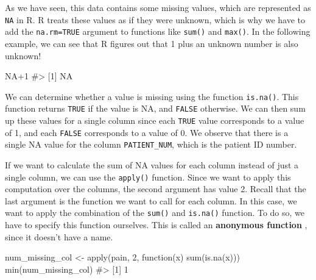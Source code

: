 \documentclass[
  letterpaper,
]{latex/krantz}
\makeatletter
\newenvironment{Shaded}{\begin{snugshade}}{\end{snugshade}}
\newcommand{\CommentTok}[1]{\textcolor[rgb]{0.37,0.37,0.37}{#1}}
\newcommand{\ConstantTok}[1]{\textcolor[rgb]{0.56,0.35,0.01}{#1}}
\newcommand{\ControlFlowTok}[1]{\textcolor[rgb]{0.00,0.23,0.31}{#1}}
\newcommand{\DecValTok}[1]{\textcolor[rgb]{0.68,0.00,0.00}{#1}}
\newcommand{\FunctionTok}[1]{\textcolor[rgb]{0.28,0.35,0.67}{#1}}
\newcommand{\NormalTok}[1]{\textcolor[rgb]{0.00,0.23,0.31}{#1}}
\newcommand{\OtherTok}[1]{\textcolor[rgb]{0.00,0.23,0.31}{#1}}
\newcommand{\SpecialCharTok}[1]{\textcolor[rgb]{0.37,0.37,0.37}{#1}}
\newenvironment{kframe}{%
\medskip{}
\setlength{\fboxsep}{.8em}
 \def\at@end@of@kframe{}%
 \ifinner\ifhmode%
  \def\at@end@of@kframe{\end{minipage}}%
  \begin{minipage}{\columnwidth}%
 \fi\fi%
 \def\FrameCommand##1{\hskip\@totalleftmargin \hskip-\fboxsep
 \colorbox{shadecolor}{##1}\hskip-\fboxsep
     \hskip-\linewidth \hskip-\@totalleftmargin \hskip\columnwidth}%
 \MakeFramed {\advance\hsize-\width
   \@totalleftmargin\z@ \linewidth\hsize
   \@setminipage}}%
 {\par\unskip\endMakeFramed%
 \at@end@of@kframe}
\renewenvironment{Shaded}{\begin{kframe}}{\end{kframe}}
\makeatother
\begin{document}
As we have seen, this data contains some missing values, which are
represented as \texttt{NA} in R. R treats these values as if they were
unknown, which is why we have to add the \texttt{na.rm=TRUE} argument to
functions like \texttt{sum()} and \texttt{max()}. In the following
example, we can see that R figures out that 1 plus an unknown number is
also unknown!

\begin{Shaded}
\begin{Highlighting}[]
\ConstantTok{NA}\SpecialCharTok{+}\DecValTok{1}
\CommentTok{\#\textgreater{} [1] NA}
\end{Highlighting}
\end{Shaded}

We can determine whether a value is missing using the function
\texttt{is.na()}. This
function returns \texttt{TRUE} if the value is NA, and \texttt{FALSE}
otherwise. We can then sum up these values for a single column since
each \texttt{TRUE} value corresponds to a value of 1, and each
\texttt{FALSE} corresponds to a value of 0. We observe that there is a
single NA value for the column \texttt{PATIENT\_NUM}, which is the
patient ID number.

\begin{Shaded}
\end{Shaded}

If we want to calculate the sum of NA values for each column instead of
just a single column, we can use the \texttt{apply()} function. Since we
want to apply this computation over the columns, the second argument has
value 2. Recall that the last argument is the function we want to call
for each column. In this case, we want to apply the combination of the
\texttt{sum()} and \texttt{is.na()} function. To do so, we have to
specify this function ourselves. This is called an \textbf{anonymous
function} , since it doesn't have a name.

\begin{Shaded}
\begin{Highlighting}[]
\NormalTok{num\_missing\_col }\OtherTok{\textless{}{-}} \FunctionTok{apply}\NormalTok{(pain, }\DecValTok{2}\NormalTok{, }\ControlFlowTok{function}\NormalTok{(x) }\FunctionTok{sum}\NormalTok{(}\FunctionTok{is.na}\NormalTok{(x)))}
\FunctionTok{min}\NormalTok{(num\_missing\_col)}
\CommentTok{\#\textgreater{} [1] 1}
\end{Highlighting}
\end{Shaded}
\end{document}

